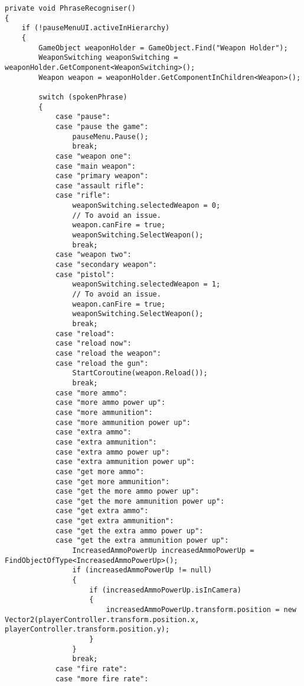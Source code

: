 \documentclass{article}
\begin{document}
\begin{verbatim}
private void PhraseRecogniser()
{
    if (!pauseMenuUI.activeInHierarchy)
    {
        GameObject weaponHolder = GameObject.Find("Weapon Holder");
        WeaponSwitching weaponSwitching = weaponHolder.GetComponent<WeaponSwitching>();
        Weapon weapon = weaponHolder.GetComponentInChildren<Weapon>();

        switch (spokenPhrase)
        {
            case "pause":
            case "pause the game":
                pauseMenu.Pause();
                break;
            case "weapon one":
            case "main weapon":
            case "primary weapon":
            case "assault rifle":
            case "rifle":
                weaponSwitching.selectedWeapon = 0;
                // To avoid an issue.
                weapon.canFire = true;
                weaponSwitching.SelectWeapon();
                break;
            case "weapon two":
            case "secondary weapon":
            case "pistol":
                weaponSwitching.selectedWeapon = 1;
                // To avoid an issue.
                weapon.canFire = true;
                weaponSwitching.SelectWeapon();
                break;
            case "reload":
            case "reload now":
            case "reload the weapon":
            case "reload the gun":
                StartCoroutine(weapon.Reload());
                break;
            case "more ammo":
            case "more ammo power up":
            case "more ammunition":
            case "more ammunition power up":
            case "extra ammo":
            case "extra ammunition":
            case "extra ammo power up":
            case "extra ammunition power up":
            case "get more ammo":
            case "get more ammunition":
            case "get the more ammo power up":
            case "get the more ammunition power up":
            case "get extra ammo":
            case "get extra ammunition":
            case "get the extra ammo power up":
            case "get the extra ammunition power up":
                IncreasedAmmoPowerUp increasedAmmoPowerUp = FindObjectOfType<IncreasedAmmoPowerUp>();
                if (increasedAmmoPowerUp != null)
                {
                    if (increasedAmmoPowerUp.isInCamera)
                    {
                        increasedAmmoPowerUp.transform.position = new Vector2(playerController.transform.position.x, playerController.transform.position.y);
                    }
                }
                break;
            case "fire rate":
            case "more fire rate":

\end{verbatim}
\end{document}
